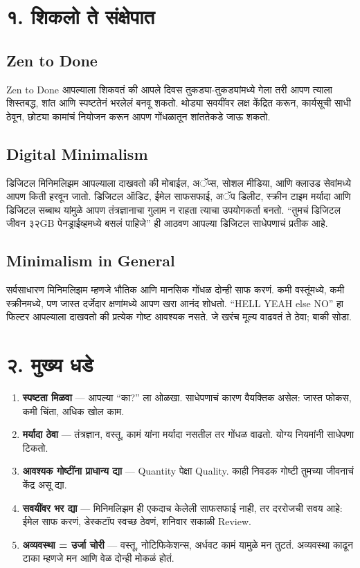 \section*{१. शिकलो ते संक्षेपात}

\subsection*{Zen to Done}  
Zen to Done आपल्याला शिकवतं की आपले दिवस तुकड्या-तुकड्यांमध्ये गेला तरी आपण त्याला शिस्तबद्ध, शांत आणि स्पष्टतेनं भरलेलं बनवू शकतो. थोड्या सवयींवर लक्ष केंद्रित करून, कार्यसूची साधी ठेवून, छोट्या कामांचं नियोजन करून आपण गोंधळातून शांततेकडे जाऊ शकतो.  

\subsection*{Digital Minimalism}  
डिजिटल मिनिमलिझम आपल्याला दाखवतो की मोबाईल, अॅप्स, सोशल मीडिया, आणि क्लाउड सेवांमध्ये आपण किती हरवून जातो. डिजिटल ऑडिट, ईमेल साफसफाई, अॅप डिलीट, स्क्रीन टाइम मर्यादा आणि डिजिटल सब्बाथ यांमुळे आपण तंत्रज्ञानाचा गुलाम न राहता त्याचा उपयोगकर्ता बनतो. “तुमचं डिजिटल जीवन ३२GB पेनड्राईव्हमध्ये बसलं पाहिजे” ही आठवण आपल्या डिजिटल साधेपणाचं प्रतीक आहे.  

\subsection*{Minimalism in General}  
सर्वसाधारण मिनिमलिझम म्हणजे भौतिक आणि मानसिक गोंधळ दोन्ही साफ करणं. कमी वस्तूंमध्ये, कमी स्क्रीनमध्ये, पण जास्त दर्जेदार क्षणांमध्ये आपण खरा आनंद शोधतो. “HELL YEAH else NO” हा फिल्टर आपल्याला दाखवतो की प्रत्येक गोष्ट आवश्यक नसते. जे खरंच मूल्य वाढवतं ते ठेवा; बाकी सोडा.  

\section*{२. मुख्य धडे}

\begin{enumerate}
  \item \textbf{स्पष्टता मिळवा} — आपल्या “का?” ला ओळखा. साधेपणाचं कारण वैयक्तिक असेल: जास्त फोकस, कमी चिंता, अधिक खोल काम.  
  \item \textbf{मर्यादा ठेवा} — तंत्रज्ञान, वस्तू, कामं यांना मर्यादा नसतील तर गोंधळ वाढतो. योग्य नियमांनी साधेपणा टिकतो.  
  \item \textbf{आवश्यक गोष्टींना प्राधान्य द्या} — Quantity पेक्षा Quality. काही निवडक गोष्टी तुमच्या जीवनाचं केंद्र असू द्या.  
  \item \textbf{सवयींवर भर द्या} — मिनिमलिझम ही एकदाच केलेली साफसफाई नाही, तर दररोजची सवय आहे: ईमेल साफ करणं, डेस्कटॉप स्वच्छ ठेवणं, शनिवार सकाळी Review.  
  \item \textbf{अव्यवस्था = उर्जा चोरी} — वस्तू, नोटिफिकेशन्स, अर्धवट कामं यामुळे मन तुटतं. अव्यवस्था काढून टाका म्हणजे मन आणि वेळ दोन्ही मोकळं होतं.  
\end{enumerate}

